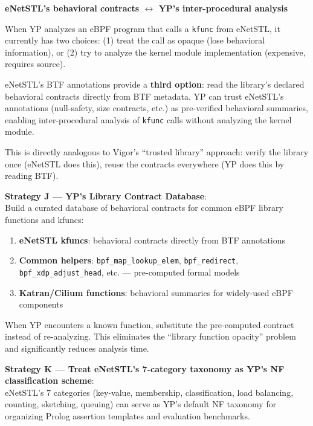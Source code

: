 \begin{analogybox}
\textbf{eNetSTL's behavioral contracts $\leftrightarrow$ YP's inter-procedural analysis}

When YP analyzes an eBPF program that calls a \texttt{kfunc} from eNetSTL, it currently has two choices: (1) treat the call as opaque (lose behavioral information), or (2) try to analyze the kernel module implementation (expensive, requires source).

eNetSTL's BTF annotations provide a \textbf{third option}: read the library's declared behavioral contracts directly from BTF metadata. YP can trust eNetSTL's annotations (null-safety, size contracts, etc.) as pre-verified behavioral summaries, enabling inter-procedural analysis of \texttt{kfunc} calls without analyzing the kernel module.

This is directly analogous to Vigor's ``trusted library'' approach: verify the library once (eNetSTL does this), reuse the contracts everywhere (YP does this by reading BTF).
\end{analogybox}

\begin{strategybox}
\textbf{Strategy J --- YP's Library Contract Database}:\\
Build a curated database of behavioral contracts for common eBPF library functions and kfuncs:
\begin{enumerate}
  \item \textbf{eNetSTL kfuncs}: behavioral contracts directly from BTF annotations
  \item \textbf{Common helpers}: \texttt{bpf\_map\_lookup\_elem}, \texttt{bpf\_redirect}, \texttt{bpf\_xdp\_adjust\_head}, etc. --- pre-computed formal models
  \item \textbf{Katran/Cilium functions}: behavioral summaries for widely-used eBPF components
\end{enumerate}
When YP encounters a known function, substitute the pre-computed contract instead of re-analyzing. This eliminates the ``library function opacity'' problem and significantly reduces analysis time.

\textbf{Strategy K --- Treat eNetSTL's 7-category taxonomy as YP's NF classification scheme}:\\
eNetSTL's 7 categories (key-value, membership, classification, load balancing, counting, sketching, queuing) can serve as YP's default NF taxonomy for organizing Prolog assertion templates and evaluation benchmarks.
\end{strategybox}

